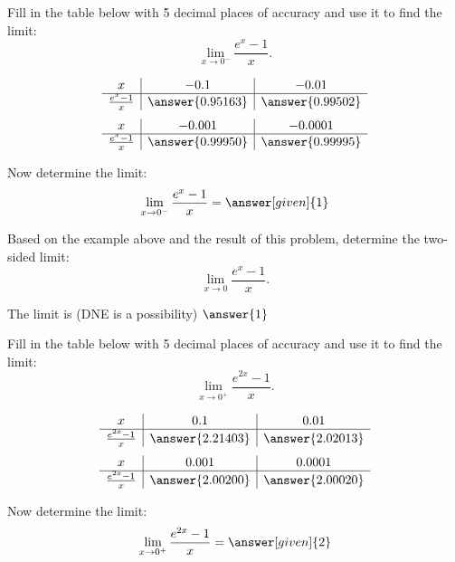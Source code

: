 \documentclass{ximera}
\begin{document}
\begin{problem}[problem 4]
Fill in the table below with 5 decimal places of accuracy and use it to find the limit:
\[\lim_{x \to 0^-} \frac{e^x - 1}{x}.\]

\begin{prompt}
\begin{center}
\[
\begin{array}{ c | c | c }
  x & -0.1 & -0.01   \\ 
	\hline 
	 \frac{e^x - 1}{x} & \answer{0.95163} & \answer{0.99502} 
\end{array}
\]
\[
\begin{array}{ c | c | c  }
  x  & -0.001 & -0.0001 \\ 
	\hline 
	 \frac{e^x - 1}{x}  & \answer{0.99950} & \answer{0.99995}
\end{array}
\]
\end{center}
Now determine the limit:
\[
\lim_{x \to 0^-} \frac{e^x - 1}{x} = \answer[given]{1}
\]
\end{prompt}

Based on the example above and the result of this problem, determine the two-sided limit:
\[
\lim_{x \to 0} \frac{e^x - 1}{x}.
\]

The limit is (DNE is a possibility) $\answer{1}$

\end{problem}


\begin{problem}[problem 5]
Fill in the table below with 5 decimal places of accuracy and use it to find the limit:
\[\lim_{x \to 0^+} \frac{e^{2x} - 1}{x}.\]

\begin{prompt}
\begin{center}
\[
\begin{array}{ c | c | c }
  x & 0.1 & 0.01   \\ 
	\hline 
	 \frac{e^{2x} - 1}{x} & \answer{2.21403} & \answer{2.02013} 
\end{array}
\]
\[
\begin{array}{ c | c | c  }
  x  & 0.001 & 0.0001 \\ 
	\hline 
	 \frac{e^{2x} - 1}{x}  & \answer{2.00200} & \answer{2.00020}
\end{array}
\]
\end{center}
Now determine the limit:
\[
\lim_{x \to 0^+} \frac{e^{2x} - 1}{x} = \answer[given]{2}
\]
\end{prompt}
\end{problem}
\end{document}
